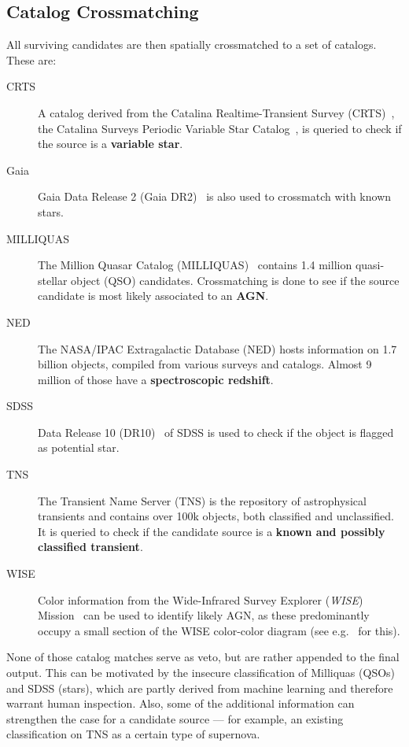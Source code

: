 \subsection{Catalog Crossmatching}\label{catmatch}
All surviving candidates are then spatially crossmatched to a set of catalogs. These are:
\begin{description}
    \item[CRTS] A catalog derived from the Catalina Realtime-Transient Survey (CRTS)~, the Catalina Surveys Periodic Variable Star Catalog~, is queried to check if the source is a \textbf{variable star}.
    \item[Gaia] Gaia Data Release 2 (Gaia DR2)~ is also used to crossmatch with known stars.
    \item[MILLIQUAS] The Million Quasar Catalog (MILLIQUAS)~ contains 1.4 million quasi-stellar object (QSO) candidates. Crossmatching is done to see if the source candidate is most likely associated to an \textbf{AGN}.
    \item[NED] The NASA/IPAC Extragalactic Database (NED) hosts information on 1.7 billion objects, compiled from various surveys and catalogs. Almost 9 million of those have a \textbf{spectroscopic redshift}.
    \item[SDSS] Data Release 10 (DR10)~ of SDSS is used to check if the object is flagged as potential star.
    \item[TNS] The Transient Name Server (TNS) is the repository of astrophysical transients and contains over 100k objects, both classified and unclassified. It is queried to check if the candidate source is a \textbf{known and possibly classified transient}.
    \item[WISE] Color information from the Wide-Infrared Survey Explorer (\textit{WISE}) Mission~ can be used to identify likely AGN, as these predominantly occupy a small section of the WISE color-color diagram (see e.g.~ for this).
\end{description}
None of those catalog matches serve as veto, but are rather appended to the final output. This can be motivated by the insecure classification of Milliquas (QSOs) and SDSS (stars), which are partly derived from machine learning and therefore warrant human inspection. Also, some of the additional information can strengthen the case for a candidate source --- for example, an existing classification on TNS as a certain type of supernova.

